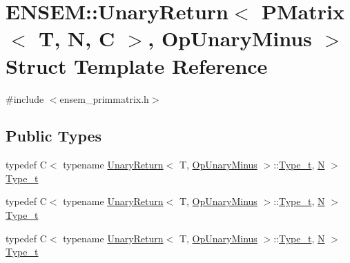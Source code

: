 \hypertarget{structENSEM_1_1UnaryReturn_3_01PMatrix_3_01T_00_01N_00_01C_01_4_00_01OpUnaryMinus_01_4}{}\section{E\+N\+S\+EM\+:\+:Unary\+Return$<$ P\+Matrix$<$ T, N, C $>$, Op\+Unary\+Minus $>$ Struct Template Reference}
\label{structENSEM_1_1UnaryReturn_3_01PMatrix_3_01T_00_01N_00_01C_01_4_00_01OpUnaryMinus_01_4}


{\ttfamily \#include $<$ensem\+\_\+primmatrix.\+h$>$}

\subsection*{Public Types}
\begin{DoxyCompactItemize}
\item 
typedef C$<$ typename \mbox{\hyperlink{structENSEM_1_1UnaryReturn}{Unary\+Return}}$<$ T, \mbox{\hyperlink{structENSEM_1_1OpUnaryMinus}{Op\+Unary\+Minus}} $>$\+::\mbox{\hyperlink{structENSEM_1_1UnaryReturn_3_01PMatrix_3_01T_00_01N_00_01C_01_4_00_01OpUnaryMinus_01_4_a95616e60eeb26361ade1627f14c7ee18}{Type\+\_\+t}}, \mbox{\hyperlink{adat__devel_2lib_2hadron_2operator__name__util_8cc_a7722c8ecbb62d99aee7ce68b1752f337}{N}} $>$ \mbox{\hyperlink{structENSEM_1_1UnaryReturn_3_01PMatrix_3_01T_00_01N_00_01C_01_4_00_01OpUnaryMinus_01_4_a95616e60eeb26361ade1627f14c7ee18}{Type\+\_\+t}}
\item 
typedef C$<$ typename \mbox{\hyperlink{structENSEM_1_1UnaryReturn}{Unary\+Return}}$<$ T, \mbox{\hyperlink{structENSEM_1_1OpUnaryMinus}{Op\+Unary\+Minus}} $>$\+::\mbox{\hyperlink{structENSEM_1_1UnaryReturn_3_01PMatrix_3_01T_00_01N_00_01C_01_4_00_01OpUnaryMinus_01_4_a95616e60eeb26361ade1627f14c7ee18}{Type\+\_\+t}}, \mbox{\hyperlink{adat__devel_2lib_2hadron_2operator__name__util_8cc_a7722c8ecbb62d99aee7ce68b1752f337}{N}} $>$ \mbox{\hyperlink{structENSEM_1_1UnaryReturn_3_01PMatrix_3_01T_00_01N_00_01C_01_4_00_01OpUnaryMinus_01_4_a95616e60eeb26361ade1627f14c7ee18}{Type\+\_\+t}}
\item 
typedef C$<$ typename \mbox{\hyperlink{structENSEM_1_1UnaryReturn}{Unary\+Return}}$<$ T, \mbox{\hyperlink{structENSEM_1_1OpUnaryMinus}{Op\+Unary\+Minus}} $>$\+::\mbox{\hyperlink{structENSEM_1_1UnaryReturn_3_01PMatrix_3_01T_00_01N_00_01C_01_4_00_01OpUnaryMinus_01_4_a95616e60eeb26361ade1627f14c7ee18}{Type\+\_\+t}}, \mbox{\hyperlink{adat__devel_2lib_2hadron_2operator__name__util_8cc_a7722c8ecbb62d99aee7ce68b1752f337}{N}} $>$ \mbox{\hyperlink{structENSEM_1_1UnaryReturn_3_01PMatrix_3_01T_00_01N_00_01C_01_4_00_01OpUnaryMinus_01_4_a95616e60eeb26361ade1627f14c7ee18}{Type\+\_\+t}}
\end{DoxyCompactItemize}


